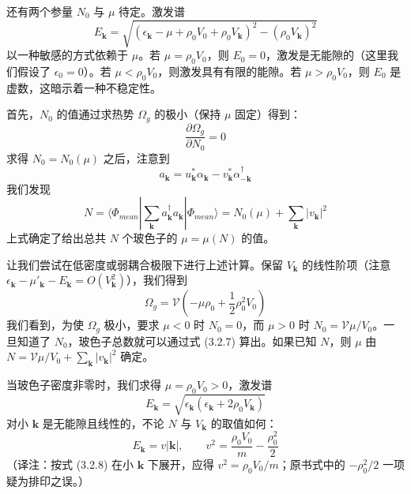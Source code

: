 还有两个参量 $N_0$ 与 $\mu$ 待定。激发谱
\begin{equation*}
E_{\pmb{k}}=\sqrt{(\epsilon_{\pmb{k}}-\mu+\rho_0V_0+\rho_0V_{\pmb{k}})^2-(\rho_0V_{\pmb{k}})^2}
\end{equation*}
以一种敏感的方式依赖于 $\mu$。若 $\mu=\rho_0V_0$，则 $E_0=0$，激发是无能隙的（这里我们假设了 $\epsilon_0=0$）。若 $\mu<\rho_0V_0$，则激发具有有限的能隙。若 $\mu>\rho_0V_0$，则 $E_0$ 是虚数，这暗示着一种不稳定性。

首先，$N_0$ 的值通过求热势 $\Omega_g$ 的极小（保持 $\mu$ 固定）得到：
\begin{equation*}
\frac{\partial\Omega_g}{\partial N_0}=0\tag{3.2.6}
\end{equation*}
求得 $N_0=N_0(\mu)$ 之后，注意到
\begin{equation*}
a_{\pmb{k}}=u_{\pmb{k}}^{*}\alpha_{\pmb{k}}-v_{\pmb{k}}^{*}\alpha_{-\pmb{k}}^{\dagger}
\end{equation*}
我们发现
\begin{equation*}
N=\langle\Phi_{mean}|\sum_{\pmb{k}}a_{\pmb{k}}^{\dagger}a_{\pmb{k}}|\Phi_{mean}\rangle=N_0(\mu)+\sum_{\pmb{k}}|v_{\pmb{k}}|^2\tag{3.2.7}
\end{equation*}
上式确定了给出总共 $N$ 个玻色子的 $\mu=\mu(N)$ 的值。

让我们尝试在低密度或弱耦合极限下进行上述计算。保留 $V_{\pmb{k}}$ 的线性阶项（注意 $\epsilon_{\pmb{k}}-\mu'_{\pmb{k}}-E_{\pmb{k}}=O(V_{\pmb{k}}^2)$），我们得到
\begin{equation*}
\Omega_g=\mathcal{V}\left(-\mu\rho_0+\frac{1}{2}\rho_0^2V_0\right)
\end{equation*}
我们看到，为使 $\Omega_g$ 极小，要求 $\mu<0$ 时 $N_0=0$，而 $\mu>0$ 时 $N_0=\mathcal{V}\mu/V_0$。一旦知道了 $N_0$，玻色子总数就可以通过式 (3.2.7) 算出。如果已知 $N$，则 $\mu$ 由 $N=\mathcal{V}\mu/V_0+\sum_{\pmb{k}}|v_{\pmb{k}}|^2$ 确定。

当玻色子密度非零时，我们求得 $\mu=\rho_0V_0>0$，激发谱
\begin{equation*}
E_{\pmb{k}}=\sqrt{\epsilon_{\pmb{k}}\left(\epsilon_{\pmb{k}}+2\rho_0V_{\pmb{k}}\right)}\tag{3.2.8}
\end{equation*}
对小 $\pmb{k}$ 是无能隙且线性的，不论 $N$ 与 $V_{\pmb{k}}$ 的取值如何：
\begin{equation*}
E_{\pmb{k}}=v|\pmb{k}|,\qquad v^2=\frac{\rho_0V_0}{m}-\frac{\rho_0^2}{2}\tag{3.2.9}
\end{equation*}
（译注：按式 (3.2.8) 在小 $\pmb{k}$ 下展开，应得 $v^2=\rho_0V_0/m$；原书式中的 $-\rho_0^2/2$ 一项疑为排印之误。）

